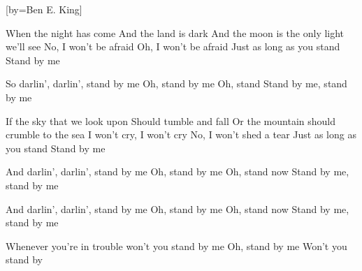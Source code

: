 [by={Ben E. King}]

  \beginverse
  When the night has come
  And the land is dark
  And the moon is the only light we'll see
  No, I won't be afraid
  Oh, I won't be afraid
  Just as long as you stand
  Stand by me
  \endverse

  \beginverse
  So darlin', darlin', stand by me
  Oh, stand by me
  Oh, stand
  Stand by me, stand by me
  \endverse

  \beginverse
  If the sky that we look upon
  Should tumble and fall
  Or the mountain should crumble to the sea
  I won't cry, I won't cry
  No, I won't shed a tear
  Just as long as you stand
  Stand by me
  \endverse

  \beginverse
  And darlin', darlin', stand by me
  Oh, stand by me
  Oh, stand now
  Stand by me, stand by me
  \endverse

  \beginverse
  And darlin', darlin', stand by me
  Oh, stand by me
  Oh, stand now
  Stand by me, stand by me
  \endverse

  \beginverse
  Whenever you're in trouble won't you stand by me
  Oh, stand by me
  Won't you stand by
  \endverse
\endsong
